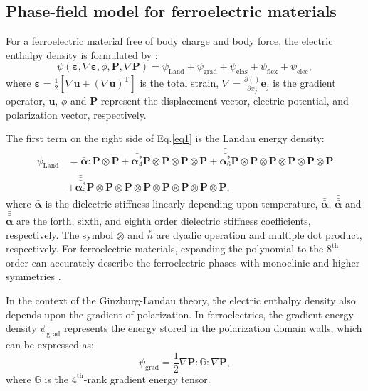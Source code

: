 \documentclass[final,times,fleqn,11pt]{elsarticle}
\begin{document}
\subsection{Phase-field model for ferroelectric materials}
For a ferroelectric material free of body charge and body force, the electric enthalpy density is formulated by \cite{gu_flexoelectricity_2014,jiang_polarization_2015}:
\begin{equation}\label{eq1}
    \psi(\mathbf{\varepsilon},\nabla\mathbf{\varepsilon},\phi,\mathbf{P},\nabla\mathbf{P})
    =\psi_\mathrm{Land}+\psi_\mathrm{grad}+\psi_\mathrm{elas}+\psi_\mathrm{flex}+\psi_\mathrm{elec},
\end{equation}
where $\mathbf{\varepsilon}=\frac{1}{2}\left[\nabla \mathbf{u}+(\nabla\mathbf{u})^\mathrm{T}\right]$ is the total strain, $\nabla=\frac{\partial ()}{\partial x_j}\mathbf{e}_j $ is the gradient operator, $\mathbf{u}$, $\phi$ and $\mathbf{P}$ represent the displacement vector, electric potential, and polarization vector, respectively.

The first term on the right side of Eq.\eqref{eq1} is the Landau energy density:
\begin{equation}
   \begin{split}
     \psi_\mathrm{Land}&=\bar{\mathbf{\alpha}}:\mathbf{P}\otimes\mathbf{P}+\bar{\bar{\mathbf{\alpha}^*_4}} \mathbf{P}\otimes\mathbf{P}\otimes\mathbf{P}\otimes\mathbf{P}+\bar{\bar{\bar{\mathbf{\alpha}^*_6}}}\mathbf{P}\otimes\mathbf{P}\otimes\mathbf{P}\otimes\mathbf{P}\otimes\mathbf{P}\otimes\mathbf{P}\\
    &+\bar{\bar{\bar{\bar{\mathbf{\alpha}^*_8}}}} \mathbf{P}\otimes\mathbf{P}\otimes\mathbf{P}\otimes\mathbf{P}\otimes\mathbf{P}\otimes\mathbf{P}\otimes\mathbf{P}\otimes\mathbf{P},
   \end{split}
\end{equation}
where $\bar{\mathbf{\alpha}}$ is the dielectric stiffness linearly depending upon temperature, $\bar{\bar{\mathbf{\alpha}}}$, $\bar{\bar{\bar{\mathbf{\alpha}}}}$ and $\bar{\bar{\bar{\bar{\mathbf{\alpha}}}}}$ are the forth, sixth, and eighth order dielectric stiffness coefficients, respectively. The symbol $\otimes$ and  $\overset{*}{n}$ are dyadic operation and multiple dot product, respectively. For ferroelectric materials, expanding the polynomial to the $8^\mathrm{th}$-order can accurately describe the ferroelectric phases with monoclinic and higher symmetries \cite{heitmann_thermodynamics_2014}.

In the context of the Ginzburg-Landau theory, the electric enthalpy density also depends upon the gradient of polarization. In ferroelectrics, the gradient energy density $\psi_\mathrm{grad}$ represents the energy stored in the polarization domain walls, which can be expressed as:
\begin{equation}
    \psi_\mathrm{grad}=\frac{1}{2}\nabla\mathbf{P}:\mathbb{G}:\nabla \mathbf{P},
\end{equation}
where $\mathbb{G}$ is the $4^\mathrm{th}$-rank gradient energy tensor. 
\end{document}

